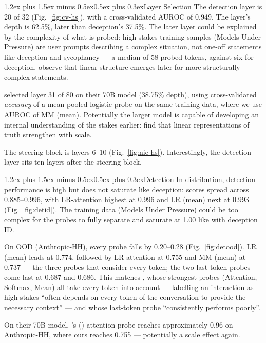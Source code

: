 \documentclass[conference]{IEEEtran}
\makeatletter
\renewcommand{\subsubsection}{\@startsection{subsubsection}{3}{1em}%
  {1.2ex plus 1.5ex minus 0.5ex}{0.5ex plus 0.3ex}{\normalfont\normalsize\itshape}}
\makeatother
\begin{document}
\subsubsection{Layer Selection}
The detection layer is 20 of 32 (Fig.~\ref{fig:cv-hs}), with a
cross-validated AUROC of 0.949. The layer's depth is 62.5\%, later than deception's
37.5\%. The later layer could be explained by the complexity of what is
probed: high-stakes training samples (Models Under Pressure) are user
prompts describing a complex situation, not one-off statements like
deception and sycophancy --- a median of 58 probed tokens, against six for
deception. \citet{marks2024} observe that linear structure emerges
later for more structurally complex statements.

\citet{mckenzie2025} selected layer 31 of 80 on their 70B model
(38.75\% depth), using cross-validated \emph{accuracy} of a mean-pooled
logistic probe on the same training data, where we use AUROC of MM (mean).
Potentially the larger model is capable of developing an internal understanding of the
stakes earlier: \citet{marks2024} find that linear representations
of truth strengthen with scale.

The steering block is layers 6--10 (Fig.~\ref{fig:nie-hs}). Interestingly,
the detection layer sits ten layers after the steering block.

\subsubsection{Detection}
In distribution, detection performance is high but does not saturate like deception:
scores spread across 0.885--0.996, with LR-attention highest at 0.996 and
LR (mean) next at 0.993 (Fig.~\ref{fig:detid}). The training data (Models
Under Pressure) could be too complex for the probes to fully separate and saturate at 1.00 like with deception ID.

On OOD (Anthropic-HH), every probe falls by 0.20--0.28
(Fig.~\ref{fig:detood}). LR (mean) leads at 0.774, followed by LR-attention
at 0.755 and MM (mean) at 0.737 --- the three probes that consider every
token; the two last-token probes come last at 0.687 and 0.686. This matches
\citet[§3]{mckenzie2025}, whose strongest probes (Attention, Softmax,
Mean) all take every token into account --- labelling an interaction as
high-stakes ``often depends on every token of the conversation to provide
the necessary context'' --- and whose last-token probe ``consistently
performs poorly''.

On their 70B model, \citeauthor{mckenzie2025}'s (\citeyear{mckenzie2025}) attention probe reaches
approximately 0.96 on Anthropic-HH, where ours reaches 0.755 ---
potentially a scale effect again.
\end{document}
